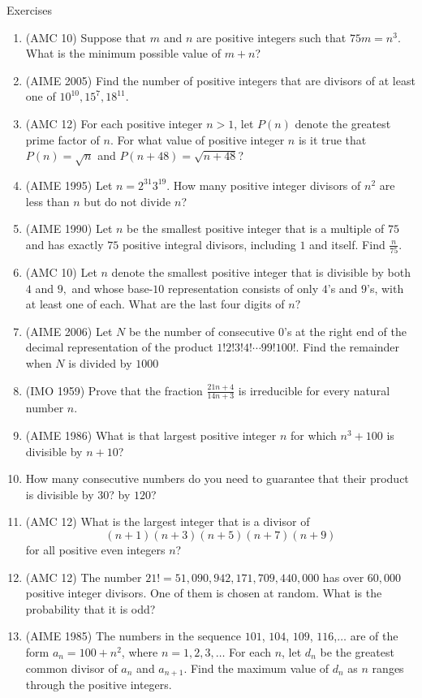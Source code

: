 \begin{xcb}{Exercises}
\begin{enumerate}
\item (AMC 10) Suppose that $m$ and $n$ are positive integers such that $75m = n^{3}$. What is the minimum possible value of $m + n$?
\item (AIME 2005) Find the number of positive integers that are divisors of at least one of $10^{10},15^7,18^{11}$.
\item(AMC 12) For each positive integer $n > 1$, let $P(n)$ denote the greatest prime factor of $n$. For what value of positive integer $n$ is it true that $P(n) = \sqrt{n}$ and $P(n+48) = \sqrt{n+48}$?
\item (AIME 1995) Let $n=2^{31}3^{19}.$ How many positive integer divisors of $n^2$ are less than $n$ but do not divide $n$?
\item (AIME 1990) Let $n$ be the smallest positive integer that is a multiple of $75$ and has exactly $75$ positive integral divisors, including $1$ and itself. Find $\frac{n}{75}$.
\item (AMC 10) Let $n$ denote the smallest positive integer that is divisible by both $4$ and $9,$ and whose base-$10$ representation consists of only $4$'s and $9$'s, with at least one of each. What are the last four digits of $n?$
\item (AIME 2006) Let $N$ be the number of consecutive $0$'s at the right end of the decimal representation of the product $1!2!3!4!\cdots99!100!.$ Find the remainder when $N$ is divided by $1000$
\item (IMO 1959) Prove that the fraction $\frac{21n+4}{14n+3}$ is irreducible for every natural number $n$.
\item (AIME 1986) What is that largest positive integer $n$ for which $n^3+100$ is divisible by $n+10$?
\item  How many consecutive numbers do you need to guarantee that their product is divisible by $30$? by $120$?
\item(AMC 12) What is the largest integer that is a divisor of \[(n+1)(n+3)(n+5)(n+7)(n+9)\] for all positive even integers $n$?
\item (AMC 12) The number $21!=51,090,942,171,709,440,000$ has over $60,000$ positive integer divisors. One of them is chosen at random. What is the probability that it is odd?
\item (AIME 1985) The numbers in the sequence $101$, $104$, $109$, $116$,$\ldots$ are of the form $a_n=100+n^2$, where $n=1,2,3,\ldots$ For each $n$, let $d_n$ be the greatest common divisor of $a_n$ and $a_{n+1}$. Find the maximum value of $d_n$ as $n$ ranges through the positive integers.

\end{enumerate}
\end{xcb}
